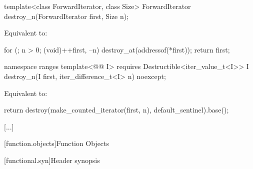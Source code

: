 %
\begin{itemdecl}
template<class ForwardIterator, class Size>
  ForwardIterator destroy_n(ForwardIterator first, Size n);
\end{itemdecl}

\begin{itemdescr}
\pnum
\effects
Equivalent to:
\begin{codeblock}
for (; n > 0; (void)++first, --n)
  destroy_at(addressof(*first));
return first;
\end{codeblock}
\end{itemdescr}

\begin{addedblock}
%
\begin{itemdecl}
namespace ranges {
  template<@@ I>
      requires Destructible<iter_value_t<I>>
    I destroy_n(I first, iter_difference_t<I> n) noexcept;
}
\end{itemdecl}

\begin{itemdescr}
\pnum
\effects Equivalent to:
\begin{codeblock}
return destroy(make_counted_iterator(first, n), default_sentinel{}).base();
\end{codeblock}
\end{itemdescr}
\end{addedblock}

[...]

\setcounter{section}{13}
[function.objects]{Function Objects}

[functional.syn]{Header  synopsis}

